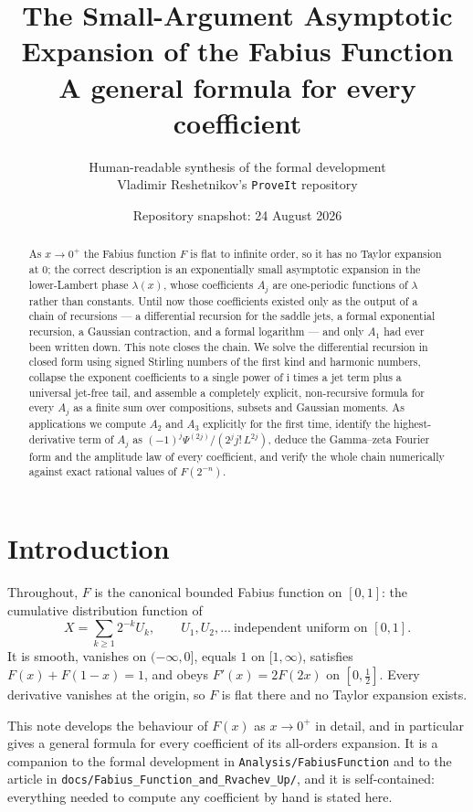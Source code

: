 \documentclass[11pt,oneside]{article}
\title{\bfseries The Small-Argument Asymptotic Expansion of the Fabius Function\\[0.35em]
\large A general formula for every coefficient}
\author{Human-readable synthesis of the formal development\\
\small Vladimir Reshetnikov's \texttt{ProveIt} repository}
\date{Repository snapshot: 24 August 2026}
\theoremstyle{definition}
\theoremstyle{remark}
\newcommand{\ii}{\mathrm i}
\newcommand{\repo}{\nolinkurl{Analysis/FabiusFunction}}
\begin{document}
\maketitle

\begin{abstract}
As $x\to0^+$ the Fabius function $F$ is flat to infinite order, so it has no
Taylor expansion at $0$; the correct description is an exponentially small
asymptotic expansion in the lower-Lambert phase $\lambda(x)$, whose
coefficients $A_j$ are one-periodic functions of $\lambda$ rather than
constants.  Until now those coefficients existed only as the output of a chain
of recursions --- a differential recursion for the saddle jets, a formal
exponential recursion, a Gaussian contraction, and a formal logarithm --- and
only $A_1$ had ever been written down.  This note closes the chain.  We solve
the differential recursion in closed form using signed Stirling numbers of the
first kind and harmonic numbers, collapse the exponent coefficients to a single
power of $\ii$ times a jet term plus a universal jet-free tail, and assemble a
completely explicit, non-recursive formula for every $A_j$ as a finite sum over
compositions, subsets and Gaussian moments.  As applications we compute $A_2$
and $A_3$ explicitly for the first time, identify the highest-derivative term
of $A_j$ as $(-1)^j\Psi^{(2j)}/(2^jj!\,L^{2j})$, deduce the
Gamma--zeta Fourier form and the amplitude law of every coefficient, and verify
the whole chain numerically against exact rational values of $F(2^{-n})$.
\end{abstract}

\tableofcontents

\section{Introduction}

Throughout, $F$ is the canonical bounded Fabius function on $[0,1]$: the
cumulative distribution function of
\[
  X=\sum_{k\ge1}2^{-k}U_k,\qquad U_1,U_2,\dots\ \text{independent uniform on }[0,1].
\]
It is smooth, vanishes on $(-\infty,0]$, equals $1$ on $[1,\infty)$, satisfies
$F(x)+F(1-x)=1$, and obeys $F'(x)=2F(2x)$ on $[0,\tfrac12]$.  Every derivative
vanishes at the origin, so $F$ is flat there and no Taylor expansion exists.

This note develops the behaviour of $F(x)$ as $x\to0^+$ in detail, and in
particular gives a general formula for every coefficient of its all-orders
expansion.  It is a companion to the formal development in \repo{} and to the
article in \nolinkurl{docs/Fabius_Function_and_Rvachev_Up/}, and it is
self-contained: everything needed to compute any coefficient by hand is stated
here.
\end{document}
